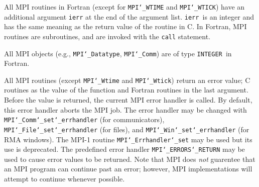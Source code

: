 \par
{}
All MPI routines in Fortran (except for {\tt MPI{\tt \char`\_}WTIME} and {\tt MPI{\tt \char`\_}WTICK}) have
an additional argument {\tt ierr} at the end of the argument list.  {\tt ierr
}is an integer and has the same meaning as the return value of the routine
in C.  In Fortran, MPI routines are subroutines, and are invoked with the
{\tt call} statement.
\par
All MPI objects (e.g., {\tt MPI{\tt \char`\_}Datatype}, {\tt MPI{\tt \char`\_}Comm}) are of type {\tt INTEGER
}in Fortran.
\par
{}
\par
All MPI routines (except {\tt MPI{\tt \char`\_}Wtime} and {\tt MPI{\tt \char`\_}Wtick}) return an error value;
C routines as the value of the function and Fortran routines in the last
argument.  Before the value is returned, the current MPI error handler is
called.  By default, this error handler aborts the MPI job.  The error handler
may be changed with {\tt MPI{\tt \char`\_}Comm{\tt \char`\_}set{\tt \char`\_}errhandler} (for communicators),
{\tt MPI{\tt \char`\_}File{\tt \char`\_}set{\tt \char`\_}errhandler} (for files), and {\tt MPI{\tt \char`\_}Win{\tt \char`\_}set{\tt \char`\_}errhandler} (for
RMA windows).  The MPI-1 routine {\tt MPI{\tt \char`\_}Errhandler{\tt \char`\_}set} may be used but
its use is deprecated.  The predefined error handler
{\tt MPI{\tt \char`\_}ERRORS{\tt \char`\_}RETURN} may be used to cause error values to be returned.
Note that MPI does {\em not} guarentee that an MPI program can continue past
an error; however, MPI implementations will attempt to continue whenever
possible.
\par
{}
\endmanpage
